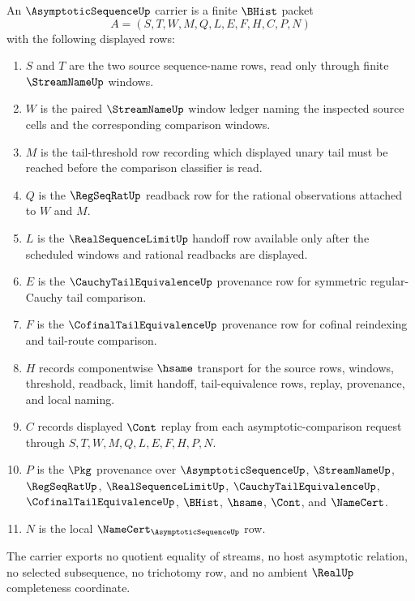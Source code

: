 \begin{definition}
\label{def:asymptotic-sequence-carrier}
An $\AsymptoticSequenceUp$ carrier is a finite $\BHist$ packet
$$
A=(S,T,W,M,Q,L,E,F,H,C,P,N)
$$
with the following displayed rows:
\begin{enumerate}
\item $S$ and $T$ are the two source sequence-name rows, read only through finite $\StreamNameUp$ windows.
\item $W$ is the paired $\StreamNameUp$ window ledger naming the inspected source cells and the corresponding comparison windows.
\item $M$ is the tail-threshold row recording which displayed unary tail must be reached before the comparison classifier is read.
\item $Q$ is the $\RegSeqRatUp$ readback row for the rational observations attached to $W$ and $M$.
\item $L$ is the $\RealSequenceLimitUp$ handoff row available only after the scheduled windows and rational readbacks are displayed.
\item $E$ is the $\CauchyTailEquivalenceUp$ provenance row for symmetric regular-Cauchy tail comparison.
\item $F$ is the $\CofinalTailEquivalenceUp$ provenance row for cofinal reindexing and tail-route comparison.
\item $H$ records componentwise $\hsame$ transport for the source rows, windows, threshold, readback, limit handoff, tail-equivalence rows, replay, provenance, and local naming.
\item $C$ records displayed $\Cont$ replay from each asymptotic-comparison request through $S,T,W,M,Q,L,E,F,H,P,N$.
\item $P$ is the $\Pkg$ provenance over $\AsymptoticSequenceUp$, $\StreamNameUp$, $\RegSeqRatUp$, $\RealSequenceLimitUp$, $\CauchyTailEquivalenceUp$, $\CofinalTailEquivalenceUp$, $\BHist$, $\hsame$, $\Cont$, and $\NameCert$.
\item $N$ is the local $\NameCert_{\AsymptoticSequenceUp}$ row.
\end{enumerate}
The carrier exports no quotient equality of streams, no host asymptotic relation, no selected subsequence, no trichotomy row, and no ambient $\RealUp$ completeness coordinate.
\end{definition}

